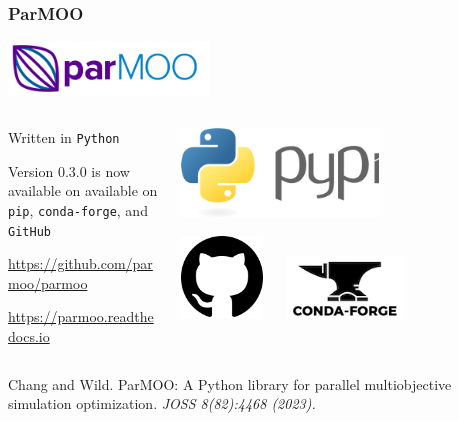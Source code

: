 \documentclass[aspectratio=169]{beamer}
\begin{document}
\begin{frame}\frametitle{ParMOO}

\begin{center}
\includegraphics[width=0.4\textwidth]{../img/logos/logo-parmoo.png}
\end{center}

\begin{columns}
\begin{column}{0.7\textwidth}

Written in {\tt Python}

\bigskip

Version 0.3.0 is now available on
available on {\tt pip}, {\tt conda-forge}, and {\tt GitHub}

\bigskip
\bigskip
\url{https://github.com/parmoo/parmoo}

\bigskip

\url{https://parmoo.readthedocs.io}
\end{column}
\begin{column}{0.2\textwidth}
\begin{center}
\includegraphics[width=0.6\textwidth]{../img/logos/logo-py.png}

\bigskip

\includegraphics[width=0.25\textwidth]{../img/logos/logo-gh.png}
$\quad$
\includegraphics[width=0.35\textwidth]{../img/logos/logo-conda.png}
\end{center}
\end{column}
\end{columns}

\bigskip
\bigskip

{\tiny
Chang and Wild.
ParMOO: A Python library for parallel multiobjective simulation optimization.
{\sl JOSS 8(82):4468 (2023).}
}

\end{frame}
\end{document}
